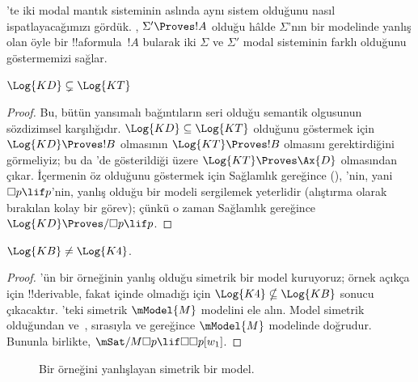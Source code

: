 \documentclass[../../../include/open-logic-section]{subfiles}
\begin{document}


'te iki modal mantık sisteminin aslında aynı sistem
olduğunu nasıl ispatlayacağımızı gördük. ,
$\Sigma' \Proves !A$ olduğu hâlde $\Sigma$'nın bir modelinde yanlış olan
öyle bir !!a{formula}~$!A$ bularak iki $\Sigma$ ve $\Sigma'$ modal
sisteminin farklı olduğunu göstermemizi sağlar.

\begin{prop}
  $\Log{KD} \subsetneq \Log{KT}$
\end{prop}

\begin{proof} Bu, bütün yansımalı bağıntıların seri olduğu semantik
  olgusunun sözdizimsel karşılığıdır. $\Log{KD} \subseteq \Log{KT}$
  olduğunu göstermek için $\Log{KD} \Proves !B$ olmasının
  $\Log{KT} \Proves !B$ olmasını gerektirdiğini görmeliyiz; bu da
  'de gösterildiği
  üzere $\Log{KT} \Proves \Ax{D}$ olmasından çıkar. İçermenin öz olduğunu
  göstermek için Sağlamlık gereğince (),
  'nin, yani $\Box p \lif p$'nin, yanlış olduğu bir  modeli
  sergilemek yeterlidir (alıştırma olarak bırakılan kolay bir görev);
  çünkü o zaman Sağlamlık gereğince $\Log{KD} \Proves/ \Box p \lif p$.
\end{proof}

\begin{prop}
  $\Log{KB} \neq \Log{K4}$. 
\end{prop}

\begin{proof}
  'ün bir örneğinin yanlış olduğu simetrik bir model kuruyoruz;
  örnek açıkça  için !!{derivable}, fakat  içinde
  olmadığı için $\Log{K4} \nsubseteq \Log{KB}$ sonucu çıkacaktır.
  'teki simetrik $\mModel{M}$ modelini ele alın. Model
  simetrik olduğundan  ve~, sırasıyla 
  ve  gereğince $\mModel{M}$ modelinde
  doğrudur. Bununla birlikte,
  $\mSat/{M}{\Box p \lif \Box\Box p}[w_1]$.
\end{proof}

\begin{figure}[htpb]
  \centering
  \caption{Bir  örneğini yanlışlayan simetrik bir model.}
\end{figure}
 
\end{document}
